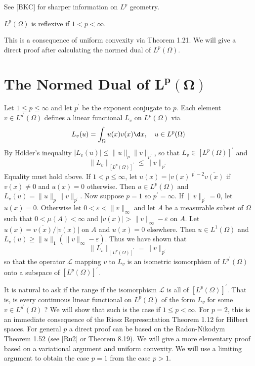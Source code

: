 See [BKC] for sharper information on $L^p$ geometry.

\begin{corollary}\label{cor:2.40}
  $L^p(\Omega)$ is reflexive if $1<p<\infty$.
\end{corollary}
This is a consequence of uniform convexity via Theorem 1.21.
We will give a direct proof after calculating the normed dual of $L^p(\Omega)$.


\section[The Normed Dual of \texorpdfstring{$L^p(\Omega)$}{L\textasciicircum p(Ω)}]{The Normed Dual of $\bm{L^p(\Omega)}$}


\begin{para}
  Let $1 \leq p \leq \infty$ and let $p^{\prime}$ be the exponent conjugate to $p$.
  Each element $v \in L^{p^{\prime}}(\Omega)$ defines a linear functional
  $L_v$ on $L^p(\Omega)$ via
  \[
  L_v(u)=\int_{\Omega} u(x) v(x) \d x, \quad u \in L^p(\Omega)
  \]
  By Hölder's inequality $\left|L_v(u)\right| \leq\|u\|_p\|v\|_{p^{\prime}}$, so that $L_v \in\left[L^p(\Omega)\right]^{\prime}$ and
  \[
  \|L_v\|_{\left[L^p(\Omega)\right]^{\prime}} \leq\|v\|_{p^{\prime}}
  \]
  Equality must hold above. If $1<p \leq \infty$, let $u(x)=|v(x)|^{p^{\prime}-2} \overline{v(x)}$ if $v(x) \neq 0$ and $u(x)=0$ otherwise. Then $u \in L^p(\Omega)$ and $L_v(u)=\|u\|_p\|v\|_{p^{\prime}}$.
  Now suppose $p=1$ so $p^{\prime}=\infty$. If $\|v\|_{p^{\prime}}=0$, let $u(x)=0$. Otherwise let $0<\varepsilon<\|v\|_{\infty}$ and let $A$ be a measurable subset of $\Omega$ such that $0<\mu(A)<\infty$
  and $|v(x)|>\|v\|_{\infty}-\varepsilon$ on $A$. Let $u(x)=\overline{v(x)} /|v(x)|$ on $A$ and $u(x)=0$ elsewhere. Then $u \in L^1(\Omega)$ and $L_v(u) \geq\|u\|_1\left(\|v\|_{\infty}-\varepsilon\right)$. Thus we have shown that
  \[
  \|L_v\|_{\left[L^p(\Omega)\right]^{\prime}}=\|v\|_{p^{\prime}}
  \]
  so that the operator $\mathcal{L}$ mapping $v$ to $L_v$ is an isometric isomorphism of $L^{p^{\prime}}(\Omega)$ onto a subspace of $\left[L^p(\Omega)\right]^{\prime}$.
\end{para}


\begin{para}
  It is natural to ask if the range if the isomorphism $\mathcal{L}$ is all of $\left[L^p(\Omega)\right]^{\prime}$. That is, is every continuous linear functional on $L^p(\Omega)$ of the form $L_v$ for some $v \in L^{p^{\prime}}(\Omega)$ ? We will show that such is the case if $1 \leq p<\infty$. For $p=2$, this is an immediate consequence of the Riesz Representation Theorem 1.12 for Hilbert spaces. For general $p$ a direct proof can be based on the Radon-Nikodym Theorem 1.52 (see [Ru2] or Theorem 8.19). We will give a more elementary proof based on a variational argument and uniform convexity. We will use a limiting argument to obtain the case $p=1$ from the case $p>1$.
\end{para}



